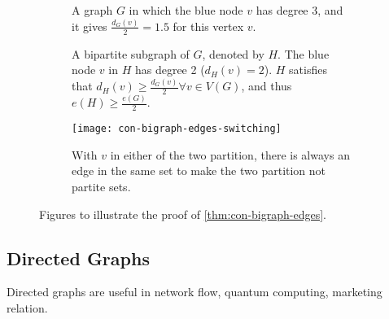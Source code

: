 \documentclass[../src/handouts/main.tex]{subfiles}
\begin{document}
\begin{figure}[htbp]
  \centering
  \begin{subfigure}[t]{.4\textwidth}
    \centering
    \caption{A graph $G$ in which the blue node $v$ has degree 3, and it gives $\frac{d_G(v)}{2} = 1.5$ for this vertex $v$.}
    \label{fig:con-bigraph-edges-original}
  \end{subfigure}
  \hspace{.15\textwidth}
  \begin{subfigure}[t]{.4\textwidth}
    \centering
    \caption{A bipartite subgraph of $G$, denoted by $H$. The blue node $v$ in $H$ has degree 2 ($d_H(v) = 2$). $H$ satisfies that $d_H(v) \geq \frac{d_G(v)}{2} \forall v \in V(G)$, and thus $e(H) \geq \frac{e(G)}{2}$.}
    \label{fig:con-bigraph-edges-subgraph}
  \end{subfigure}

  \vspace{1em}

  \begin{subfigure}[t]{.75\textwidth}
    \centering
    \texttt{[image: con-bigraph-edges-switching]}
    \caption{With $v$ in either of the two partition, there is always an edge in the same set to make the two partition not partite sets.}
    \label{fig:con-bigraph-edges-switching}
  \end{subfigure}
  \caption{Figures to illustrate the proof of \cref{thm:con-bigraph-edges}.}
  \label{fig:con-bigraph-edges}
\end{figure}



\subsection{Directed Graphs}\label{sec:con-directed-graphs}

Directed graphs are useful in network flow, quantum computing, marketing relation.
\end{document}
